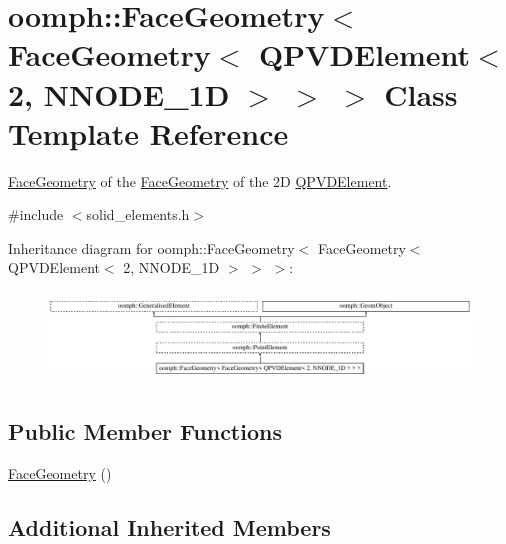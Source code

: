 \hypertarget{classoomph_1_1FaceGeometry_3_01FaceGeometry_3_01QPVDElement_3_012_00_01NNODE__1D_01_4_01_4_01_4}{}\section{oomph\+:\+:Face\+Geometry$<$ Face\+Geometry$<$ Q\+P\+V\+D\+Element$<$ 2, N\+N\+O\+D\+E\+\_\+1D $>$ $>$ $>$ Class Template Reference}
\label{classoomph_1_1FaceGeometry_3_01FaceGeometry_3_01QPVDElement_3_012_00_01NNODE__1D_01_4_01_4_01_4}


\hyperlink{classoomph_1_1FaceGeometry}{Face\+Geometry} of the \hyperlink{classoomph_1_1FaceGeometry}{Face\+Geometry} of the 2D \hyperlink{classoomph_1_1QPVDElement}{Q\+P\+V\+D\+Element}.  




{\ttfamily \#include $<$solid\+\_\+elements.\+h$>$}

Inheritance diagram for oomph\+:\+:Face\+Geometry$<$ Face\+Geometry$<$ Q\+P\+V\+D\+Element$<$ 2, N\+N\+O\+D\+E\+\_\+1D $>$ $>$ $>$\+:\begin{figure}[H]
\begin{center}
\leavevmode
\includegraphics[height=2.408602cm]{classoomph_1_1FaceGeometry_3_01FaceGeometry_3_01QPVDElement_3_012_00_01NNODE__1D_01_4_01_4_01_4}
\end{center}
\end{figure}
\subsection*{Public Member Functions}
\begin{DoxyCompactItemize}
\item 
\hyperlink{classoomph_1_1FaceGeometry_3_01FaceGeometry_3_01QPVDElement_3_012_00_01NNODE__1D_01_4_01_4_01_4_a5865335d09fe6d1de42cd21681336184}{Face\+Geometry} ()
\end{DoxyCompactItemize}
\subsection*{Additional Inherited Members}



